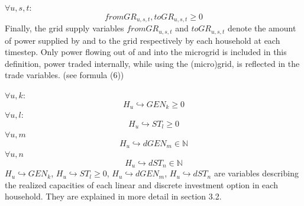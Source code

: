 \documentclass[
	11pt,								%
	DIV10,								%
	a4paper,         					%
	oneside,							%
	headheight=20pt,					%
	footheight=20pt,					%
    parskip=full,						%
    listof=totoc,						%
	bibliography=totoc,					%
	index=totoc,						%
]{scrartcl}
\begin{document}
	\\\\
	$\forall u,s,t$:
	\begin{equation}
		fromGR_{u,s,t}, toGR_{u,s,t} \geq 0
	\end{equation}
	Finally, the grid supply variables $fromGR_{u,s,t}$ and $toGR_{u,s,t}$ denote the amount of power supplied by and to the grid respectively by each household at each timestep. Only power flowing out of and into the microgrid is included in this definition, power traded internally, while using the (micro)grid, is reflected in the trade variables. (see formula (6))
	
	$\forall u,k$:
	\begin{equation}
		H_u\hookrightarrow GEN_k \geq 0
	\end{equation}
	$\forall u,l$:
	\begin{equation}
		H_u\hookrightarrow  ST_l \geq 0
	\end{equation}
	$\forall u,m$
	\begin{equation}
		H_u\hookrightarrow d GEN_m \in \mathbb{N}
	\end{equation}
	$\forall u,n$
	\begin{equation}
		H_u\hookrightarrow d ST_n \in \mathbb{N}
	\end{equation}
	$H_u\hookrightarrow GEN_k$, $H_u\hookrightarrow  ST_l \geq 0$, $H_u\hookrightarrow d GEN_m$, $H_u\hookrightarrow d ST_n$ are variables describing the realized capacities of each linear and discrete investment option in each household. They are explained in more detail in section 3.2.
\end{document}

